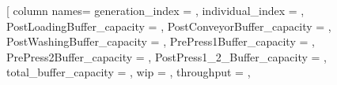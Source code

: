 \documentclass[a4paper,fleqn]{cas-sc}
\begin{document}
  \begin{table}[ ]                                                                                               
  \centering                                                                                                        
  \caption{Pareto front returned by the framework for Scenario~S1 (TH/WIP)                                          
  on Case~A over one representative seed. All 19 rows are non-dominated on                                          
  (WIP, TH); the front collapses to 15 unique buffer configurations. Buf~1                                          
  through Buf~6 are, respectively, the PostLoading, PostConveyor,                                                   
  PostWashing, PrePress1, PrePress2, and PostPress1--2 buffer capacities.}                                          
  \label{tab:paretofront}                                                                                           
  \csvreader[                                                                                                       
      column names={                                                                                                
          generation_index = \genIdx,                                                                               
          individual_index = \indIdx,                                                                               
          PostLoadingBuffer_capacity = \capA,                                                                       
          PostConveyorBuffer_capacity = \capB,                                                                      
          PostWashingBuffer_capacity = \capC,                                                                       
          PrePress1Buffer_capacity = \capD,                                                                         
          PrePress2Buffer_capacity = \capE,                                                                         
          PostPress1_2_Buffer_capacity = \capF,                                                                     
          total_buffer_capacity = \capTotal,                                                                        
          wip = \valWip,                                                                                            
          throughput = \valTp                                                                                       
      },                                                                                                            

\end{table}
\end{document}
